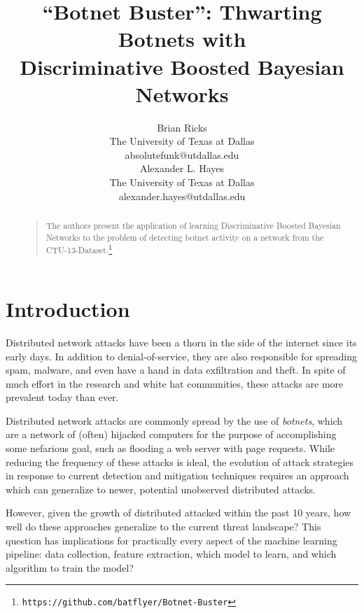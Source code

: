 \documentclass[letterpaper]{article}
\begin{document}
%
\title{``Botnet Buster'': Thwarting Botnets with\\Discriminative Boosted Bayesian Networks}

\author{Brian Ricks\\
The University of Texas at Dallas\\
absolutefunk@utdallas.edu\\
\And
Alexander L. Hayes\\
The University of Texas at Dallas\\
alexander.hayes@utdallas.edu
}

\maketitle
\begin{abstract}
\begin{quote}
The authors present the application of learning Discriminative Boosted Bayesian Networks to the problem of detecting botnet activity on a network from the CTU-13-Dataset.\footnote{\texttt{https://github.com/batflyer/Botnet-Buster}}
\end{quote}
\end{abstract}

\section{Introduction}
Distributed network attacks have been a thorn in the side of the internet since its early days.  In addition to denial-of-service, they are also responsible for spreading spam, malware, and even have a hand in data exfiltration and theft.  In spite of much effort in the research and white hat communities, these attacks are more prevalent today than ever.

Distributed network attacks are commonly spread by the use of \emph{botnets}, which are a network of (often) hijacked computers for the purpose of accomplishing some nefarious goal, such as flooding a web server with page requests.  While reducing the frequency of these attacks is ideal, the evolution of attack strategies in response to current detection and mitigation techniques requires an approach which can generalize to newer, potential unobserved distributed attacks.

However, given the growth of distributed attacked within the past 10 years, how well do these approaches generalize to the current threat landscape?  This question has implications for practically every aspect of the machine learning pipeline: data collection, feature extraction, which model to learn, and which algorithm to train the model?
\end{document}
